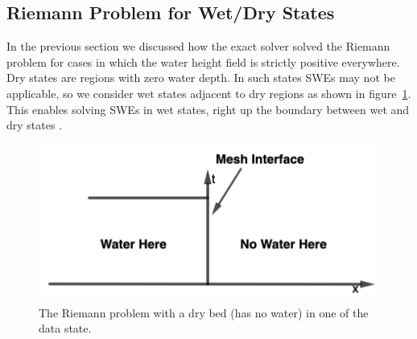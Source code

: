 \documentclass[10pt,a4paper]{article}
\begin{document}
	\subsection{Riemann Problem for Wet/Dry States}
	
	In the previous section we discussed how the exact solver solved the Riemann problem for cases in which the water height field is strictly positive everywhere. Dry states are regions with zero water depth. In such states SWEs may not be applicable, so we consider wet states adjacent to dry regions as shown in figure~\ref{fig:dry-bed}. This enables solving SWEs in wet states, right up the boundary between wet and dry states \cite{toro2001shock,ge:2008}.
	\begin{figure}[H]
		\centering
		\includegraphics[width=0.5\linewidth]{images/dd1}
		\caption{ The Riemann problem with a dry bed (has no water) in one of the data state. }
		\label{fig:dry-bed}
	\end{figure}
	
\end{document}
